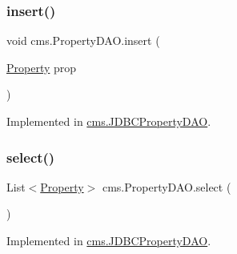 \subsubsection{\texorpdfstring{insert()}{insert()}}
{\footnotesize\ttfamily void cms.\+Property\+D\+A\+O.\+insert (\begin{DoxyParamCaption}\item[{\mbox{\hyperlink{classcms_1_1_property}{Property}}}]{prop }\end{DoxyParamCaption})}



Implemented in \mbox{\hyperlink{classcms_1_1_j_d_b_c_property_d_a_o_a5fc189c30f4112d03a6de691b1747667}{cms.\+J\+D\+B\+C\+Property\+D\+AO}}.

\mbox{\label{interfacecms_1_1_property_d_a_o_ad2087f5bf664d57bd7e75c09280b1fe5}} 
\subsubsection{\texorpdfstring{select()}{select()}}
{\footnotesize\ttfamily List$<$\mbox{\hyperlink{classcms_1_1_property}{Property}}$>$ cms.\+Property\+D\+A\+O.\+select (\begin{DoxyParamCaption}{ }\end{DoxyParamCaption})}



Implemented in \mbox{\hyperlink{classcms_1_1_j_d_b_c_property_d_a_o_a2858ac4d2c7cc8345a02e2ebb555c7f7}{cms.\+J\+D\+B\+C\+Property\+D\+AO}}.

